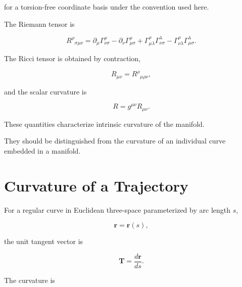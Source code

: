 \documentclass[12pt,oneside]{book}
\begin{document}
for a torsion-free coordinate basis under the convention used
here.

The Riemann tensor is

\begin{equation}
    R^\rho{}_{\sigma\mu\nu}
    =
    \partial_\mu
    \Gamma^\rho_{\nu\sigma}
    -
    \partial_\nu
    \Gamma^\rho_{\mu\sigma}
    +
    \Gamma^\rho_{\mu\lambda}
    \Gamma^\lambda_{\nu\sigma}
    -
    \Gamma^\rho_{\nu\lambda}
    \Gamma^\lambda_{\mu\sigma}.
    \label{eq:chapter-three-riemann}
\end{equation}

The Ricci tensor is obtained by contraction,

\begin{equation}
    R_{\mu\nu}
    =
    R^\rho{}_{\mu\rho\nu},
    \label{eq:ricci-tensor}
\end{equation}

and the scalar curvature is

\begin{equation}
    R
    =
    g^{\mu\nu}
    R_{\mu\nu}.
    \label{eq:scalar-curvature}
\end{equation}

These quantities characterize intrinsic curvature of the
manifold.

They should be distinguished from the curvature of an individual
curve embedded in a manifold.


\section{Curvature of a Trajectory}
\label{sec:curve-curvature}

For a regular curve in Euclidean three-space parameterized by
arc length \(s\),

\begin{equation}
    \mathbf{r}
    =
    \mathbf{r}(s),
\end{equation}

the unit tangent vector is

\begin{equation}
    \mathbf{T}
    =
    \frac{d\mathbf{r}}{ds}.
    \label{eq:frenet-tangent}
\end{equation}

The curvature is
\end{document}
